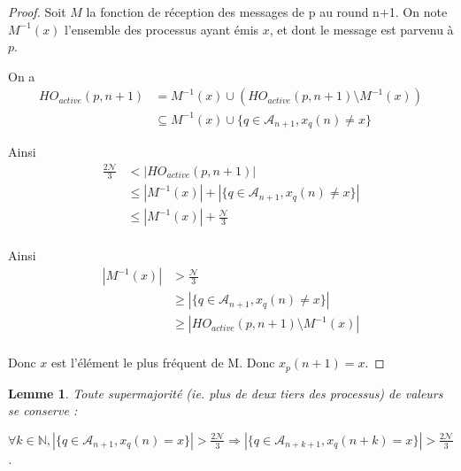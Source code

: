 \documentclass{article}
\newtheorem{lemma}{Lemme}
\begin{document}
\begin{proof}

	Soit $M$ la fonction de réception des messages de p au round n+1. On note $M^{-1}(x)$ l'ensemble des processus ayant émis $x$, et dont le message est parvenu à $p$.

	On a
\begin{equation}
\begin{split}
	HO_{active}(p, n+1) & = M^{-1}(x) \cup (HO_{active}(p, n+1) \setminus M^{-1}(x)) \\
	& \subseteq M^{-1}(x) \cup \{ q \in \mathcal{A}_{n+1} , x_q(n) \neq x \}
\end{split}
\end{equation}

Ainsi 
\begin{equation}
\begin{split}
\frac{2\mathcal{N}}{3} & < | HO_{active}(p, n+1) | \\
		& \leq | M^{-1}(x) | + | \{ q \in \mathcal{A}_{n+1} , x_q(n) \neq x \} | \\
		& \leq | M^{-1}(x) | +  \frac{\mathcal{N}}{3} \\
\end{split}
\end{equation}


	Ainsi
\begin{equation}
\begin{split}
| M^{-1}(x) | & > \frac{\mathcal{N}}{3} \\
		& \geq | \{ q \in \mathcal{A}_{n+1} , x_q(n) \neq x \} | \\
		& \geq | HO_{active}(p,n+1) \setminus M^{-1}(x) | \\
\end{split}
\end{equation}

Donc $x$ est l'élément le plus fréquent de M. Donc $x_p(n+1) = x$.

\end{proof}

\begin{lemma}

Toute supermajorité (ie. plus de deux tiers des processus) de valeurs se conserve :

	$\forall k \in \mathds{N}, | \{ q \in \mathcal{A}_{n+1} , x_q(n) = x \} | > \frac{2\mathcal{N}}{3} \Rightarrow | \{ q \in \mathcal{A}_{n+k+1} , x_q(n+k) = x \} | > \frac{2\mathcal{N}}{3}$.

\end{lemma}
\end{document}
